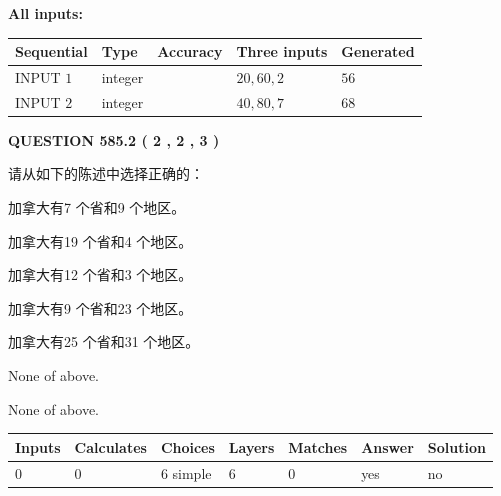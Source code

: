 \documentclass{ctexart}
\begin{document}
   
   
   
\noindent\vspace{0.1in}\hspace{-0.08in} {\textbf{\Large{All inputs: }}}
   
   
  
  
\noindent\begin{tabular}{|l|l|l|l|l|}
\hline
 Sequential & Type & Accuracy & Three inputs & Generated \\ 
\hline
 
 
  INPUT $  1 $ & integer &  & $
 20
 , 
 60
 , 
 2
 $ & $ 56 $ 
 \\  \hline  
 
 
  INPUT $  2 $ & integer &  & $
 40
 , 
 80
 , 
 7
 $ & $ 68 $ 
 \\  \hline  
 \end{tabular}
   
   
  
\vspace{0.2in}
  
{\textbf{\Large{QUESTION
585.2 
 ( 2 , 2 , 3 )
}}}
  
  
请从如下的陈述中选择正确的：
 
 
加拿大有7 个省和9 个地区。
 
 
加拿大有19 个省和4 个地区。
 
 
加拿大有12 个省和3 个地区。
 
 
加拿大有9 个省和23 个地区。
 
 
加拿大有25 个省和31 个地区。
 
 
 None of above.
 
 
\noindent{}
 
 
 None of above.
 
 
\noindent{}
 
 
   
   
   
   
\noindent\begin{tabular}{|l|l|l|l|l|l|l|}
 \hline
Inputs & Calculates & Choices & Layers & Matches & Answer & Solution \\ \hline
 0  & 
 0  & 
 6
  simple  
  & 
 6  & 
 0  & 
  yes & 
  no 
  \\ \hline
 \end{tabular}
   
\end{document}
